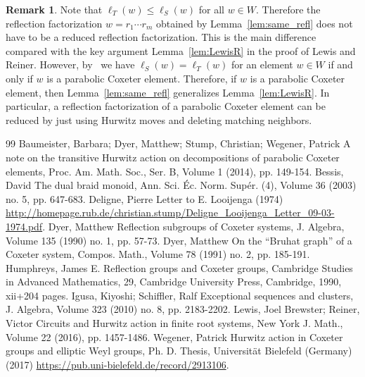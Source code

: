 \documentclass[10pt]{article}
\theoremstyle{definition}
\newtheorem{rema}[theorem]{Remark}
\begin{document}
\begin{rema}
Note that $\ell_T(w) \leq \ell_S(w)$ for all $w \in W$. Therefore the reflection factorization $w = r_1 \cdots r_m$ obtained by Lemma~\ref{lem:same_refl} does not have to be a reduced reflection factorization. This is the main difference compared with the key argument Lemma~\ref{lem:LewisR} in the proof of Lewis and Reiner. However, by~\cite[Lemma~2.1]{BDSW14} we have $\ell_S(w)=\ell_T(w)$ for an element $w \in W$ if and only if $w$ is a parabolic Coxeter element. Therefore, if $w$ is a parabolic Coxeter element, then Lemma~\ref{lem:same_refl} generalizes Lemma~\ref{lem:LewisR}. In particular, a reflection factorization of a parabolic Coxeter element can be reduced by just using Hurwitz moves and deleting matching neighbors.
\end{rema}
\begin{thebibliography}{99}
 Baumeister, Barbara; Dyer, Matthew; Stump, Christian; Wegener, Patrick A note on the transitive Hurwitz action on decompositions of parabolic Coxeter elements, Proc. Am. Math. Soc., Ser. B, Volume 1 (2014), pp. 149-154.
 Bessis, David The dual braid monoid, Ann. Sci. Éc. Norm. Supér. (4), Volume 36 (2003) no. 5, pp. 647-683.
 Deligne, Pierre Letter to E. Looijenga (1974) \url{http://homepage.rub.de/christian.stump/Deligne_Looijenga_Letter_09-03-1974.pdf}.
 Dyer, Matthew Reflection subgroups of Coxeter systems, J. Algebra, Volume 135 (1990) no. 1, pp. 57-73.
 Dyer, Matthew On the “Bruhat graph” of a Coxeter system, Compos. Math., Volume 78 (1991) no. 2, pp. 185-191.
 Humphreys, James E. Reflection groups and Coxeter groups, Cambridge Studies in Advanced Mathematics, 29, Cambridge University Press, Cambridge, 1990, xii+204 pages.
 Igusa, Kiyoshi; Schiffler, Ralf Exceptional sequences and clusters, J. Algebra, Volume 323 (2010) no. 8, pp. 2183-2202.
 Lewis, Joel Brewster; Reiner, Victor Circuits and Hurwitz action in finite root systems, New York J. Math., Volume 22 (2016), pp. 1457-1486.
 Wegener, Patrick Hurwitz action in Coxeter groups and elliptic Weyl groups, Ph. D. Thesis, Universität Bielefeld (Germany) (2017) \url{https://pub.uni-bielefeld.de/record/2913106}.
\end{thebibliography}
\end{document}
